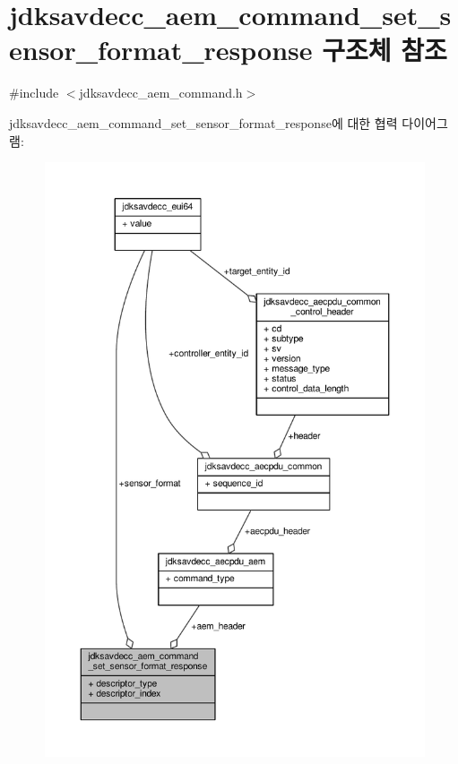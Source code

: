 \hypertarget{structjdksavdecc__aem__command__set__sensor__format__response}{}\section{jdksavdecc\+\_\+aem\+\_\+command\+\_\+set\+\_\+sensor\+\_\+format\+\_\+response 구조체 참조}
\label{structjdksavdecc__aem__command__set__sensor__format__response}


{\ttfamily \#include $<$jdksavdecc\+\_\+aem\+\_\+command.\+h$>$}



jdksavdecc\+\_\+aem\+\_\+command\+\_\+set\+\_\+sensor\+\_\+format\+\_\+response에 대한 협력 다이어그램\+:
\nopagebreak
\begin{figure}[H]
\begin{center}
\leavevmode
\includegraphics[width=350pt]{structjdksavdecc__aem__command__set__sensor__format__response__coll__graph}
\end{center}
\end{figure}
